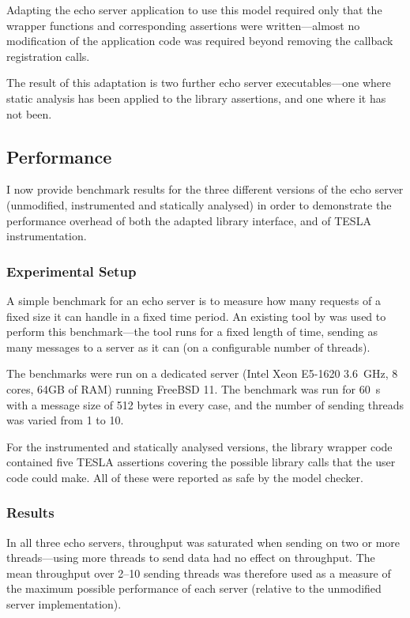 Adapting the echo server application to use this model required only that the
wrapper functions and corresponding assertions were written---almost no
modification of the application code was required beyond removing the callback
registration calls.

The result of this adaptation is two further echo server executables---one where
static analysis has been applied to the library assertions, and one where it has
not been.

\subsection{Performance}

I now provide benchmark results for the three different versions of the echo
server (unmodified, instrumented and statically analysed) in order to
demonstrate the performance overhead of both the adapted library interface, and
of TESLA instrumentation.

\subsubsection{Experimental Setup}

A simple benchmark for an echo server is to measure how many requests of a fixed
size it can handle in a fixed time period. An existing tool by
\textcite{hoyer_rust_2016} was used to perform this benchmark---the tool runs
for a fixed length of time, sending as many messages to a server as it can (on a
configurable number of threads).

The benchmarks were run on a dedicated server (Intel Xeon E5-1620
\SI{3.6}{\GHz}, 8 cores, 64GB of RAM) running FreeBSD 11. The benchmark was run
for \SI{60}{\s} with a message size of 512 bytes in every case, and the number
of sending threads was varied from 1 to 10.

For the instrumented and statically analysed versions, the library wrapper code
contained five TESLA assertions covering the possible library calls that the
user code could make. All of these were reported as safe by the model checker.

\subsubsection{Results}

In all three echo servers, throughput was saturated when sending on two or more
threads---using more threads to send data had no effect on throughput. The mean
throughput over 2--10 sending threads was therefore used as a measure of the
maximum possible performance of each server (relative to the unmodified server
implementation). 

